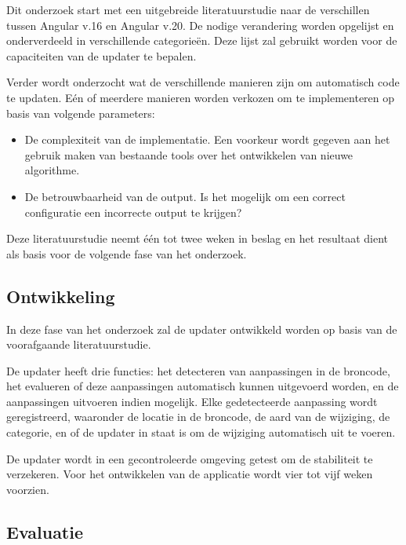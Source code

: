 Dit onderzoek start met een uitgebreide literatuurstudie naar de verschillen tussen Angular v.16 en Angular v.20.
De nodige verandering worden opgelijst en onderverdeeld in verschillende categorieën.
Deze lijst zal gebruikt worden voor de capaciteiten van de updater te bepalen.

Verder wordt onderzocht wat de verschillende manieren zijn om automatisch code te updaten.
Eén of meerdere manieren worden verkozen om te implementeren op basis van volgende parameters:
\begin{itemize}
  \item De complexiteit van de implementatie. Een voorkeur wordt gegeven aan het gebruik maken van bestaande tools over het ontwikkelen van nieuwe algorithme.
  \item De betrouwbaarheid van de output. Is het mogelijk om een correct configuratie een incorrecte output te krijgen?
\end{itemize}

Deze literatuurstudie neemt één tot twee weken in beslag en het resultaat dient als basis voor de volgende fase van het onderzoek.

\subsection{Ontwikkeling}

In deze fase van het onderzoek zal de updater ontwikkeld worden op basis van de voorafgaande literatuurstudie.

De updater heeft drie functies: het detecteren van aanpassingen in de broncode, het evalueren of deze aanpassingen automatisch kunnen uitgevoerd worden, en de aanpassingen uitvoeren indien mogelijk.
Elke gedetecteerde aanpassing wordt geregistreerd, waaronder de locatie in de broncode, de aard van de wijziging, de categorie, en of de updater in staat is om de wijziging automatisch uit te voeren.

De updater wordt in een gecontroleerde omgeving getest om de stabiliteit te verzekeren.
Voor het ontwikkelen van de applicatie wordt vier tot vijf weken voorzien.

\subsection{Evaluatie}

